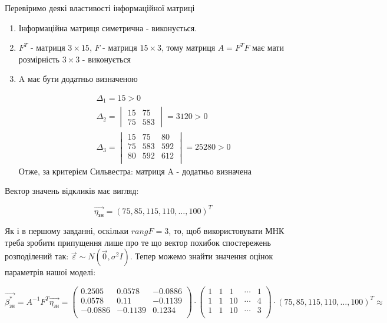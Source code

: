 \documentclass[a5paper, 20pt]{article}
\begin{document}
Перевіримо деякі властивості інформаційної матриці 

\begin{enumerate}

\item Інформаційна матриця симетрична - виконується.

\item $F^T$ - матриця $3 \times 15$, $F$ - матриця $15 \times 3$, тому матриця $A = F^T F$ має мати розмірність $3 \times 3$ - виконується

\item A має бути додатньо визначеною 

$$
\begin{aligned}
&\Delta_1 = 15 > 0 \\
%
& \Delta_2 = 
\begin{vmatrix}
15 &  75  \\
75 & 583
\end{vmatrix} =3120 >0 \\
%
& \Delta_3 = 
\begin{vmatrix}
15 &  75 &  80 \\
75 & 583 & 592 \\
80 & 592 & 612 \\
\end{vmatrix}= 25280 >0 
\end{aligned}  
$$
Отже, за критерієм Сильвестра: матриця A - додатньо визначена
\end{enumerate}

Вектор значень відкликів має вигляд:

$$ \vec{\eta_{\text{зн}}} = \left(75, 85, 115, 110, \dots, 100 \right)^T$$

Як і в першому завданні, оскільки $rang F = 3$, то, щоб використовувати МНК треба зробити припущення лише про те що вектор похибок спостережень розподілений так: $\vec{\varepsilon} \sim N(\vec{0}, \sigma^2I)$. Тепер можемо знайти значення оцінок параметрів нашої моделі:

$$ \vec{\beta^*_{\text{зн}}} = A^{-1}F^T \vec{\eta_{\text{зн}}} =
 \begin{pmatrix}
0.2505 &  0.0578 & -0.0886 \\
0.0578 &   0.11  & -0.1139 \\
-0.0886 & -0.1139 &  0.1234\\  
\end{pmatrix}
\cdot 
\begin{pmatrix}
1 & 1 & 1 & \cdots & 1 \\
1 & 1 & 10 & \cdots & 4 \\
1 & 1 &  10 & \cdots & 3 \\
\end{pmatrix}
\cdot 
\left(75, 85, 115, 110, \dots, 100 \right)^T \approx
$$
\end{document}
